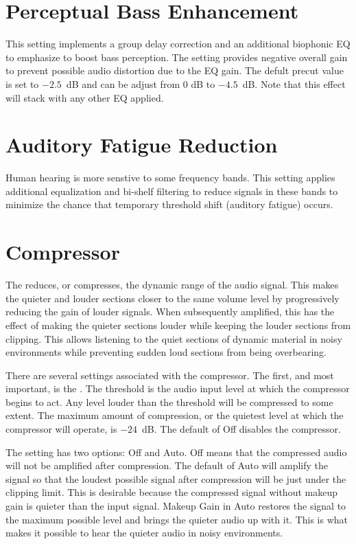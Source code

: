 \section{Perceptual Bass Enhancement}
This setting implements a group delay correction and an additional biophonic EQ to
emphasize to boost bass perception. The  setting provides
negative overall gain to prevent possible audio distortion due to the EQ
gain.  The defult precut value is set to $-2.5$~dB and can be adjust from 0 dB to $-4.5$~dB.
Note that this effect will stack with any other EQ applied.

\section{Auditory Fatigue Reduction}
Human hearing is more senstive to some frequency bands. This setting applies additional
equalization and bi-shelf filtering to reduce signals in these bands to minimize
the chance that temporary threshold shift (auditory fatigue) occurs.

\section{Compressor}
The  reduces, or compresses, the dynamic range of the audio
signal.  This makes the quieter and louder sections closer to the same volume
level by progressively reducing the gain of louder signals.  When subsequently
amplified, this has the effect of making the quieter sections louder while
keeping the louder sections from clipping.  This allows listening to the quiet
sections of dynamic material in noisy environments while preventing sudden loud
sections from being overbearing.

There are several settings associated with the compressor.  The first, and most
important, is the .  The threshold is the audio input level
at which the compressor begins to act.  Any level louder than the threshold
will be compressed to some extent.  The maximum amount of compression, or the
quietest level at which the compressor will operate, is $-24$~dB.  The default of
Off disables the compressor.

The  setting has two options: Off and Auto.  Off means
that the compressed audio will not be amplified after compression.  The default
of Auto will amplify the signal so that the loudest possible signal after
compression will be just under the clipping limit.  This is desirable because
the compressed signal without makeup gain is quieter than the input signal.
Makeup Gain in Auto restores the signal to the maximum possible level and
brings the quieter audio up with it.  This is what makes it possible to hear
the quieter audio in noisy environments.


